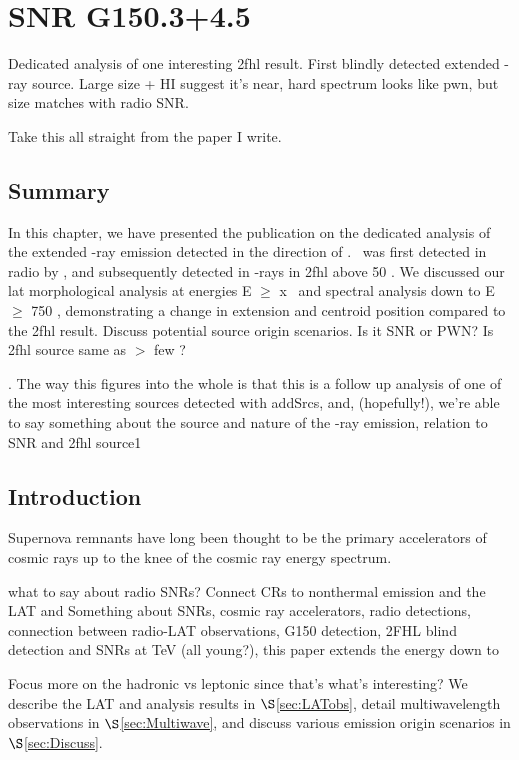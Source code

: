 \chapter{SNR G150.3+4.5}
\label{chap:G150}
Dedicated analysis  of one interesting \gls{2fhl} result. First blindly detected extended \g -ray source. Large size  + HI suggest it's near, hard spectrum looks like pwn, but size matches with radio SNR.

Take this all straight from the paper I write.


\section{\label{G150:summ}Summary} In this chapter, we have presented the publication on the dedicated analysis of the extended \g -ray emission detected in the direction of \Gone. \Gone ~was first detected in radio by \cite{Gao14}, and subsequently detected in \g-rays in \gls{2fhl} above 50 \gev. We discussed our \gls{lat} morphological analysis at energies E $\geq$ x \gev~and spectral analysis down to E $\geq$ 750 \mev, demonstrating a change in extension and centroid position compared to the \gls{2fhl} result. Discuss potential source origin scenarios. Is it SNR or PWN? Is \gls{2fhl} source same as $>$ few \gev? 

. The way this figures into the whole is that  this is a follow up analysis of one of the most interesting  sources detected with addSrcs, and, (hopefully!), we're able to say something about the source and nature of the \g-ray emission, relation to SNR and \gls{2fhl} source1

\section{Introduction} 
Supernova remnants have long been thought to be the primary accelerators of cosmic rays up to the knee of the cosmic ray energy spectrum. 

what to say about radio SNRs? Connect CRs to nonthermal emission and the LAT and 
Something about SNRs, cosmic ray accelerators, radio detections, connection between radio-LAT observations, G150 detection, 2FHL blind detection and SNRs at TeV (all young?), this paper extends the energy down to

Focus more on the hadronic vs leptonic since that's what's interesting? 
We describe the LAT and analysis results in $\S$\ref{sec:LATobs}, detail multiwavelength observations in $\S$\ref{sec:Multiwave}, and discuss various emission origin scenarios in $\S$\ref{sec:Discuss}.
%
%
